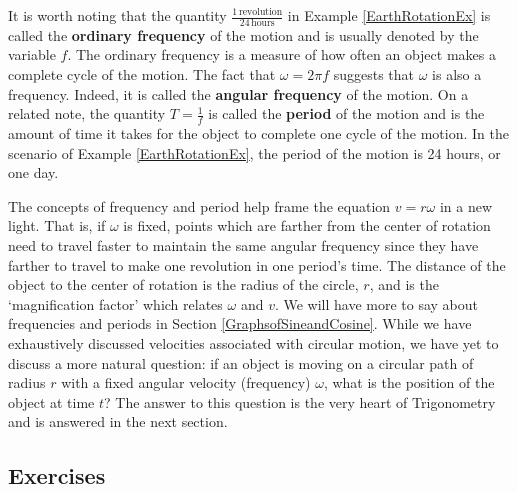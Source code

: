 It is worth noting that the quantity $\frac{1 \, \text{revolution}}{24 \, \text{hours}}$ in Example \ref{EarthRotationEx} is called the   \textbf{ordinary frequency} of the motion and is usually denoted by the variable $f$.  The ordinary frequency is a measure of how often an object makes a complete cycle of the motion.  The fact that $\omega = 2\pi f$ suggests that $\omega$ is also a frequency.  Indeed, it is called the   \textbf{angular frequency} of the motion.  On a related note, the quantity $T = \frac{1}{f}$ is called the \textbf{period} of the motion and is the amount of time it takes for the object to complete one cycle of the motion.  In the scenario of Example \ref{EarthRotationEx}, the period of the motion is 24 hours, or one day.  

\smallskip

The concepts of frequency and period help frame the equation $v = r \omega$ in a new light.  That is, if $\omega$ is fixed, points which are farther from the center of rotation need to travel faster to maintain the same angular frequency since they have farther to travel to make one revolution in one period's time.  The distance of the object to the center of rotation is the radius of the circle, $r$, and is the `magnification factor' which relates $\omega$ and $v$. We will have more to say about frequencies and periods in Section \ref{GraphsofSineandCosine}.  While we have exhaustively discussed velocities associated with circular motion, we have yet to discuss a more natural question: if an object is moving on a circular path of radius $r$ with a fixed angular velocity (frequency) $\omega$, what is the position of the object at time $t$?  The answer to this question is the very heart of Trigonometry and is answered in the next section.   

\newpage

\subsection{Exercises}




\closegraphsfile